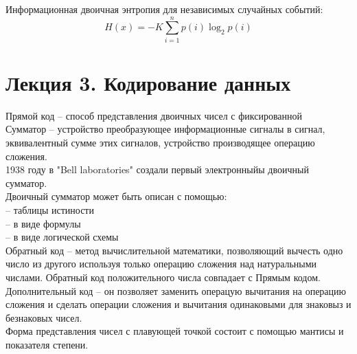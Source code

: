 \documentclass[a4paper, 12pt]{article}
\begin{document}
\begin{mdframed}[backgroundcolor=blue!20] 
       Информационная двоичная энтропия для независимых случайных событий:\\
       \[
       	H(x) = -K\sum_{i=1}^n p(i) \log_2 p(i)
       \]
    \end{mdframed}


\section*{Лекция 3. Кодирование данных}

Прямой код -- способ представления двоичных чисел с фиксированной \\

Сумматор -- устройство преобразующее информационные сигналы в сигнал, эквивалентный сумме этих сигналов, устройство производящее операцию сложения.\\
1938 году в "Bell laboratories" создали первый электронныйы двоичный сумматор.\\

Двоичный сумматор может быть описан с помощью:\\
-- таблицы истиности\\
-- в виде формулы\\
-- в виде логической схемы\\

Обратный код -- метод вычислительной математики, позволяющий вычесть одно число из другого используя только операцию сложения над натуральными числами. Обратный код положительного числа совпадает с Прямым кодом.\\

Дополнительный код -- он позволяет заменить операцую вычитания на операцию сложения и сделать операции сложения и вычитания одинаковыми для знаковыз и безнаковых чисел.\\

Форма представления чисел с плавующей точкой состоит с помощью мантисы и показателя степени.\\
\end{document}
